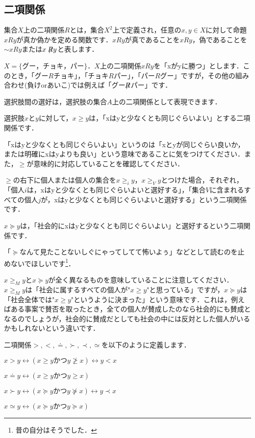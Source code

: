 \subsection{二項関係}
\begin{dfn}
    集合$X$上の二項関係$R$とは，集合$X^2$上で定義され，任意の$x,y \in X$に対して命題$xRy$が真か偽かを定める関数です．$xRy$が真であることを$xRy$，偽であることを$\sim xRy$または$x\not \! \! R y$と表します．
\end{dfn}

$X = \{グー，チョキ，パー\}$．$X$上の二項関係$xRy$を「xがyに勝つ」とします．このとき，「グー$R$チョキ」，「チョキ$R$パー」，「パー$R$グー」ですが，その他の組み合わせ(負けorあいこ)では例えば「グー$\not \! \! R$パー」です．

選択肢間の選好は，選択肢の集合$A$上の二項関係として表現できます．
\begin{dfn}
    選択肢$x$と$y$に対して，$x \ge y$は，「xはyと少なくとも同じぐらいよい」とする二項関係です．
\end{dfn}
「xはyと少なくとも同じぐらいよい」というのは「xとyが同じぐらい良いか，または明確にxはyよりも良い」という意味であることに気をつけてください．また，$\ge$が意味的に対応していることを確認してください．

\begin{dfn}
    $\ge$の右下に個人または個人の集合を$x \ge_i y$，$x \ge_V y$とつけた場合，それぞれ，「個人$i$は，xはyと少なくとも同じぐらいよいと選好する」，「集合$V$に含まれるすべての個人$j$が，xはyと少なくとも同じぐらいよいと選好する」という二項関係です．
\end{dfn}

\begin{dfn}
    $x \succeq y$は，「社会的にxはyと少なくとも同じぐらいよい」と選好するという二項関係です．
\end{dfn}

「$\succeq$なんて見たことないしぐにゃってしてて怖いよぅ」などとして読むのを止めないでほしいです\footnote{昔の自分はそうでした．}．

$x \ge_M y$と$x \succeq y$が全く異なるものを意味していることに注意してください．$x \ge_M y$は「社会に属するすべての個人が"$x \ge y$"と思っている」ですが，$x \succeq y$は「社会全体では"$x \ge y$"というように決まった」という意味です．これは，例えばある事案で賛否を取ったとき，全ての個人が賛成したのなら社会的にも賛成となるのでしょうが，社会的に賛成だとしても社会の中には反対とした個人がいるかもしれないという違いです．

二項関係$>,<,\doteq,\succ,\prec,\simeq$を以下のように定義します．
\begin{dfn}
    $x>y \leftrightarrow (x \geq y かつ y \not \geq x) \leftrightarrow y<x$
\end{dfn}
\begin{dfn}
    $x \doteq y \leftrightarrow (x \geq y かつ y \geq x)$
\end{dfn}
\begin{dfn}
    $x \succ y \leftrightarrow (x \succeq y かつ y \not \succeq x) \leftrightarrow y \prec x$
\end{dfn}
\begin{dfn}
    $x \simeq y \leftrightarrow (x \succeq y かつ y \succeq x)$
\end{dfn}

